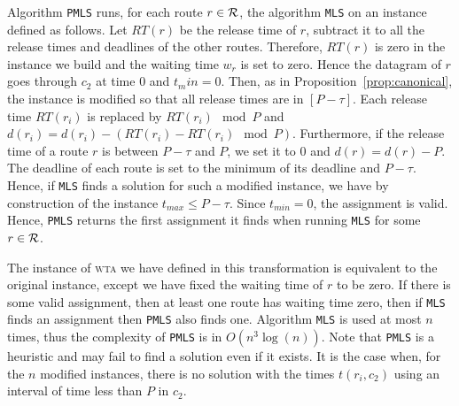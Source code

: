 \documentclass[a4paper,10pt]{article}
\newcommand\MLS{\texttt{MLS}\xspace}
\newcommand\PMLS{\texttt{PMLS}\xspace}
\newcommand\wta{\textsc{wta}\xspace}
\begin{document}
     Algorithm \PMLS runs, for each route $r \in \cal{R}$, the algorithm \MLS on an instance defined as follows. Let $RT(r)$ be the release time of $r$, subtract it to all the release times and deadlines of the other routes. Therefore, $RT(r)$ is zero in the instance we build and the waiting time $w_r$ is set to zero. Hence the datagram of $r$ goes through $c_2$ at time $0$ and $t_min = 0$.
     Then, as in Proposition~\ref{prop:canonical}, the instance is modified so that all release times are in $[P-\tau]$. Each release time $RT(r_i)$ is replaced by $RT(r_i) \mod P$ and $d(r_i) = d(r_i) - (RT(r_i) - RT(r_i) \mod P)$. Furthermore, if the release time of a route $r$ is between $P-\tau$ and $P$, we set it to $0$ and $d(r) = d(r) - P$.  The deadline of each route is set to the minimum of its deadline and $P - \tau$. Hence, if \MLS finds a solution for such a modified instance, we have by construction of the instance $t_{max} \leq P -\tau $. Since $t_{min} = 0$, the assignment is valid. Hence, \PMLS
     returns the first assignment it finds when running \MLS for some $r \in \cal{R}$.

     The instance of \wta we have defined in this transformation is equivalent 
     to the original instance, except we have fixed the waiting time of 
   $r$ to be zero. If there is some valid assignment, then at least one route has waiting time zero, then if \MLS finds an assignment then \PMLS also finds one. Algorithm \MLS is used at most $n$ times, thus the complexity of \PMLS is in $O(n^3\log(n))$. Note that \PMLS is a heuristic and may fail to find a solution even if it exists. It is the case when, for the $n$ modified instances, there is no solution with the times $t(r_i,c_2)$ using an interval of time less than $P$ in $c_2$. 



%   
%     
% 
%     
% 
% 
\end{document}
